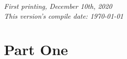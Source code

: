 \documentclass[11pt,fleqn]{book} %
\begin{document}
\noindent \textit{First printing, December 10th, 2020}\\ %
\noindent \textit{This version's compile date: \today}




\pagestyle{empty} %

\tableofcontents %

\cleardoublepage %
\setcounter{chapter}{-1}




\pagestyle{fancy} %


 \part{Part One}
\setcounter{chapter}{-1}
\nocite{*}






\end{document}
